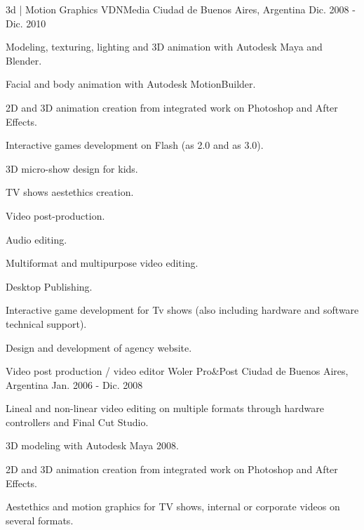 \begin{cventries}
  \cventry
    {3d | Motion Graphics} %
    {VDNMedia} %
    {Ciudad de Buenos Aires, Argentina} %
    {Dic. 2008 - Dic. 2010} %
    {
      \begin{cvitems} %
        \item {Modeling, texturing, lighting and 3D animation with Autodesk Maya and Blender.}
        \item {Facial and body animation with Autodesk MotionBuilder.}
        \item {2D and 3D animation creation from integrated work on Photoshop and After Effects.}
        \item {Interactive games development on Flash (as 2.0 and as 3.0).}
        \item {3D micro-show design for kids.}
        \item {TV shows aestethics creation.}
        \item {Video post-production.}
        \item {Audio editing.}
        \item {Multiformat and multipurpose video editing.}
        \item {Desktop Publishing.}
        \item {Interactive game development for Tv shows (also including hardware and software technical support).}
        \item {Design and development of agency website.}
      \end{cvitems}
    }
  \cventry
    {Video post production / video editor} %
    {Woler Pro\&Post} %
    {Ciudad de Buenos Aires, Argentina} %
    {Jan. 2006 - Dic. 2008} %
    {
      \begin{cvitems} %
        \item {Lineal and non-linear video editing on multiple formats through hardware controllers and Final Cut Studio.}
        \item {3D modeling with Autodesk Maya 2008.}
        \item {2D and 3D animation creation from integrated work on Photoshop and After Effects.}
        \item {Aestethics and motion graphics for TV shows, internal or corporate videos on several formats.}
      \end{cvitems}
    }
\end{cventries}
